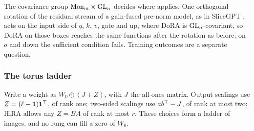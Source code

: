 The covariance group $\mathrm{Mon}_m\times\mathrm{GL}_n$ decides where  applies. One orthogonal
rotation of the residual stream of a gain-fused pre-norm model, as in SliceGPT \citep{xashkboos2024slicegpt}, acts on the
input side of $q$, $k$, $v$, gate and up, where DoRA is $\mathrm{GL}_n$-covariant, so DoRA on those boxes reaches the same
functions after the rotation as before; on $o$ and down the sufficient condition fails. Training outcomes are a separate
question.

\subsubsection{The torus ladder}\label{sec:erlangen-ladder}

Write a weight as $W_0\odot(J+Z)$, with $J$ the all-ones matrix. Output scalings use $Z=(\ell-\mathbf 1)\mathbf 1^{\top}$, of
rank one; two-sided scalings use $ab^{\top}-J$, of rank at most two; HiRA allows any $Z=BA$ of rank at most $r$. These
choices form a ladder of images, and no rung can fill a zero of $W_0$.

